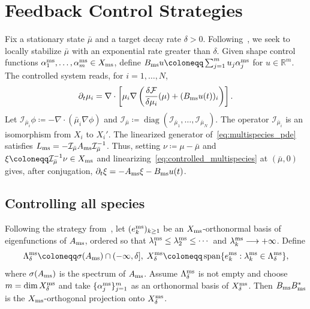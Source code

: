 \documentclass[letterpaper, 10pt, conference]{ieeeconf}
\newcommand{\R}{\mathbb{R}}
\newcommand{\F}{\mathcal{F}}
\newcommand{\rieszmap}[1][\mu]{\mathcal{I}_{#1}}
\begin{document}
\section{Feedback Control Strategies}
\label{sec:hessian-feedback}

Fix a stationary state $\bar\mu$ and a target decay rate $\delta > 0$.
Following~\cite{KaliseMoschenPavliotis2026}, we seek to locally stabilize $\bar\mu$ with an exponential rate greater than $\delta$. 
Given shape control functions $\alpha_1^{\rm ms}, \ldots, \alpha_m^{\rm ms} \in X_{\rm ms}$, define $B_{\rm ms} u \coloneqq \sum_{j=1}^m u_j \alpha_j^{\rm ms}$  for $u \in \R^m$.
The controlled system reads, for $i=1,\ldots,N$,
\begin{equation}
    \label{eq:controlled_multispecies}
    \partial_t \mu_i = \nabla \cdot \left[\mu_i \nabla \left( \frac{\delta\F}{\delta\mu_i}(\mu) + (B_{\rm ms} u(t))_i \right)\right].
\end{equation}
Let $\rieszmap[\bar\mu_i] \phi \coloneqq -\nabla \cdot (\bar\mu_i \nabla\phi)$ and $\rieszmap[\bar\mu] \coloneqq \operatorname{diag}(\rieszmap[\bar\mu_1], \ldots, \rieszmap[\bar\mu_N])$.
The operator $\rieszmap[\bar\mu_i]$ is an isomorphism from $X_i$ to $X_i'$.
The linearized generator of~\eqref{eq:multispecies_pde} satisfies $L_{\rm ms} = -\rieszmap[\bar\mu] A_{\rm ms} \rieszmap[\bar\mu]^{-1}$.
Thus, setting $\nu \coloneqq \mu - \bar\mu$ and $\xi \coloneqq \rieszmap[\bar\mu]^{-1} \nu \in X_{\rm ms}$ and linearizing~\eqref{eq:controlled_multispecies} at $(\bar\mu,0)$ gives, after conjugation, $\partial_t \xi = -A_{\rm ms}\xi - B_{\rm ms}u(t)$.

\subsection{Controlling all species}

Following the strategy from~\cite{KaliseMoschenPavliotis2026}, let $(e_k^{\rm ms})_{k \ge 1}$ be an $X_{\rm ms}$-orthonormal basis of eigenfunctions of $A_{\rm ms}$, ordered so that $\lambda_1^{\rm ms} \le \lambda_2^{\rm ms} \le \cdots$ and $\lambda_k^{\rm ms} \longrightarrow +\infty$.
Define
\[
\Lambda_\delta^{\rm ms} \coloneqq \sigma(A_{\rm ms}) \cap (-\infty,\delta], \; X_\delta^{\rm ms} \coloneqq \operatorname{span}\{e_k^{\rm ms} : \lambda_k^{\rm ms} \in \Lambda_\delta^{\rm ms}\},
\]
where $\sigma(A_{\rm ms})$ is the spectrum of $A_{\rm ms}$.
Assume $\Lambda_\delta^{\rm ms}$ is not empty and choose $m = \dim X_\delta^{\rm ms}$ and take $\{\alpha_j^{\rm ms}\}_{j=1}^m$ as an orthonormal basis of $X_\delta^{\rm ms}$.
Then $B_{\rm ms} B_{\rm ms}^\ast$ is the $X_{\rm ms}$-orthogonal projection onto $X_\delta^{\rm ms}$.
\end{document}
